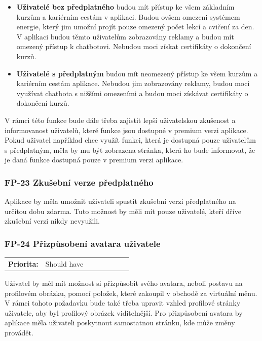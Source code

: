 \begin{itemize}
    \item \textbf{Uživatelé bez předplatného} budou mít přístup ke všem základním kurzům a kariérním cestám v aplikaci. Budou ovšem omezeni systémem energie, který jim umožní projít pouze omezený počet lekcí a cvičení za den. V aplikaci budou těmto uživatelům zobrazovány reklamy a budou mít omezený přístup k chatbotovi. Nebudou moci získat certifikáty o dokončení kurzů.
    \item \textbf{Uživatelé s předplatným} budou mít neomezený přístup ke všem kurzům a kariérním cestám aplikace. Nebudou jim zobrazovány reklamy, budou moci využívat chatbota s nižšími omezeními a budou moci získávat certifikáty o dokončení kurzů.
\end{itemize}

V rámci této funkce bude dále třeba zajistit lepší uživatelskou zkušenost a informovanost uživatelů, které funkce jsou dostupné v premium verzi aplikace. Pokud uživatel například chce využít funkci, která je dostupná pouze uživatelům s předplatným, měla by mu být zobrazena stránka, která ho bude informovat, že je daná funkce dostupná pouze v premium verzi aplikace.

\subsubsection{FP-23 Zkušební verze předplatného}

Aplikace by měla umožnit uživateli spustit zkušební verzi předplatného na určitou dobu zdarma. Tuto možnost by měli mít pouze uživatelé, kteří dříve zkušební verzi nikdy nevyužili.

\subsubsection{FP-24 Přizpůsobení avatara uživatele}

\begin{tabular}{lp{0.7\linewidth}}
    \textbf{Priorita:} & Should have \\
\end{tabular}

Uživatel by měl mít možnost si přizpůsobit svého avatara, neboli postavu na profilovém obrázku, pomocí položek, které zakoupil v obchodě za virtuální měnu. V rámci tohoto požadavku bude také třeba upravit vzhled profilové stránky uživatele, aby byl profilový obrázek viditelnější. Pro přizpůsobení avatara by aplikace měla uživateli poskytnout samostatnou stránku, kde může změny provádět. 

